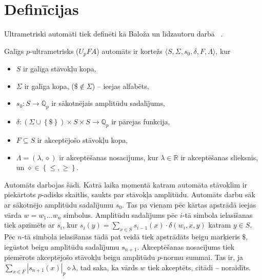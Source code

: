 \documentclass{ludis}
\begin{document}
\section{Definīcijas}
Ultrametriski automāti tiek definēti kā Baloža un līdzautoru darbā ~\citep{KasparsBalodis2013}.
\begin{definicija}
Galīgs $p$-ultrametrisks ($U_pFA$) automāts ir kortežs $\langle S, \Sigma, s_0, \delta, F, \Lambda \rangle$, kur
\begin{itemize}
  \item $S$ ir galīga stāvokļu kopa,
  \item $\Sigma$ ir galīga kopa, ($\$ \notin \Sigma$) -- ieejas alfabēts,
  \item $s_0:S \rightarrow \mathbb{Q}_p$ ir sākotnējais amplitūdu sadalījums, %
  \item $\delta: \left( \Sigma \cup \left\{ \$ \right\} \right) \times S \times S \rightarrow \mathbb{Q}_p$ ir pārejas funkcija,
  \item $F \subseteq S$ ir akceptējošo stāvokļu kopa,
  \item $\Lambda = \left( \lambda, \diamond \right)$ ir akceptēšanas nosacījums, kur $\lambda \in \mathbb{R}$ ir akceptēšanas slieksnis, un $\diamond \in \left\{ \leq, \geq \right\}$.
\end{itemize}
Automāts darbojas šādi. %
Katrā laika momentā katram automāta stāvoklim ir piekārtots $p$-adisks skaitlis, saukts par stāvokļa amplitūdu.
Automāts darbu sāk ar sākotnējo amplitūdu sadalījumu $s_0$.
Tas pa vienam pēc kārtas apstrādā ieejas vārda $w = w_1 \ldots w_n$ simbolus.
Amplitūdu sadalījums pēc $i$-tā simbola ielasīšanas tiek apzīmēts ar $s_i$, kur
$s_i(y) = \sum_{x \in S}{s_{i-1}(x) \cdot \delta \left( w_i, x, y \right) }$ katram $y \in S$.
Pēc $n$-tā simbola ielasīšanas tādā pat veidā tiek apstrādāts beigu marķieris $\$$, iegūstot beigu amplitūdu sadalījumu $s_{n+1}$.
Akceptēšanas nosacījums tiek piemērots akceptējošo stāvokļu beigu amplitūdu $p$-normu summai. Tas ir, ja $\sum_{x \in F}{\left| s_{n+1}(x) \right|_p} \diamond \lambda$, tad saka, ka vārds $w$ tiek akceptēts, citādi -- noraidīts.
\end{definicija}
\end{document}

